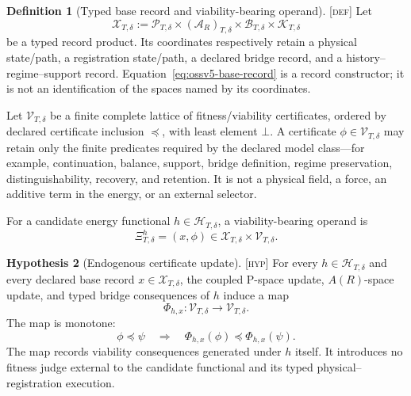 \documentclass[11pt]{article}
\newcommand{\Pspace}{\ensuremath{\mathcal P}}
\newcommand{\ARspace}{\ensuremath{\mathcal A_R}}
\newcommand{\Defn}{\textsc{[def]}}
\newcommand{\Hyp}{\textsc{[hyp]}}
\theoremstyle{definition}
\newtheorem{definition}{Definition}[section]
\newtheorem{hypothesis}[definition]{Hypothesis}
\begin{document}
\begin{definition}[Typed base record and viability-bearing operand]
\label{def:ossv5-operand}
\Defn{} Let
\begin{equation}
\mathcal X_{T,\delta}
:=
\Pspace_{T,\delta}
\times
\left(\ARspace\right)_{T,\delta}
\times
\mathcal B_{T,\delta}
\times
\mathcal K_{T,\delta}
\label{eq:ossv5-base-record}
\end{equation}
be a typed record product.  Its coordinates respectively retain a physical
state/path, a registration state/path, a declared bridge record, and a
history--regime--support record.  Equation~\eqref{eq:ossv5-base-record} is a
record constructor; it is not an identification of the spaces named by its
coordinates.

Let $\mathcal V_{T,\delta}$ be a finite complete lattice of fitness/viability
certificates, ordered by declared certificate inclusion $\preceq$, with least
element $\bot$.  A certificate $\phi\in\mathcal V_{T,\delta}$ may retain
only the finite predicates required by the declared model class---for example,
continuation, balance, support, bridge definition, regime preservation,
distinguishability, recovery, and retention.  It is not a physical field, a
force, an additive term in the energy, or an external selector.

For a candidate energy functional $h\in\mathcal H_{T,\delta}$, a
viability-bearing operand is
\begin{equation}
\Xi^h_{T,\delta}=(x,\phi)
\in
\mathcal X_{T,\delta}\times\mathcal V_{T,\delta}.
\label{eq:ossv5-operand}
\end{equation}
\end{definition}

\begin{hypothesis}[Endogenous certificate update]
\label{hyp:ossv5-certificate-update}
\Hyp{} For every $h\in\mathcal H_{T,\delta}$ and every declared base record
$x\in\mathcal X_{T,\delta}$, the coupled P-space update, $A(R)$-space update,
and typed bridge consequences of $h$ induce a map
\begin{equation}
\Phi_{h,x}:\mathcal V_{T,\delta}\longrightarrow\mathcal V_{T,\delta}.
\label{eq:ossv5-certificate-update}
\end{equation}
The map is monotone:
\begin{equation}
\phi\preceq\psi
\quad\Longrightarrow\quad
\Phi_{h,x}(\phi)\preceq\Phi_{h,x}(\psi).
\label{eq:ossv5-monotonicity}
\end{equation}
The map records viability consequences generated under $h$ itself.  It
introduces no fitness judge external to the candidate functional and its typed
physical--registration execution.
\end{hypothesis}
\end{document}
